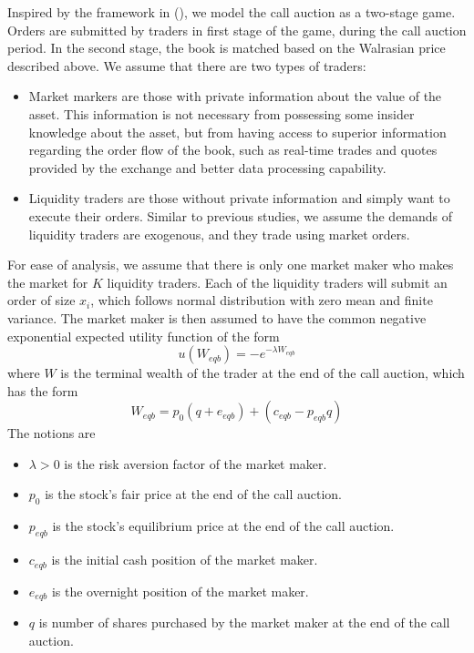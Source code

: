 \documentclass{article}
\begin{document}
Inspired by the framework in (\cite{Madhavan2015}), we model the call auction as a two-stage game. Orders are submitted by traders in first stage of the game, during the call auction period.  In the second stage, the book is matched based on the Walrasian price described above. We assume that there are two types of traders:
\begin{itemize}
\item Market markers are those with private information about the value of the asset. This information is not necessary from possessing some insider knowledge about the asset, but from having access to superior information regarding the order flow of the book, such as real-time trades and quotes provided by the exchange and better data processing capability.
\item Liquidity traders are those without private information and simply want to execute their orders. Similar to previous studies, we assume the demands of liquidity traders are exogenous, and they trade using market orders.
\end{itemize}
For ease of analysis, we assume that there is only one market maker who makes the market for $K$ liquidity traders. Each of the liquidity traders will submit an order of size $x_i$, which follows normal distribution with zero mean and finite variance. The market maker is then assumed to  have the common negative exponential expected utility function of the form
\[
u(W_{eqb}) = -e^{-\lambda W_{eqb}}
\]
where $W$ is the terminal wealth of the trader at the end of the call auction, which has the form
\[
W_{eqb} = p_0 (q + e_{eqb}) + (c_{eqb} - p_{eqb} q)
\]
The notions are 
\begin{itemize}
\item $\lambda>0$ is the risk aversion factor of the market maker.
\item $p_0$ is the stock's fair price at the end of the call auction.
\item $p_{eqb}$ is the stock's equilibrium price at the end of the call auction.
\item $c_{eqb}$ is the initial cash position of the market maker.
\item $e_{eqb}$ is the overnight position of the market maker.
\item $q$ is number of shares purchased by the market maker at the end of the call auction.
\end{itemize}
\end{document}
